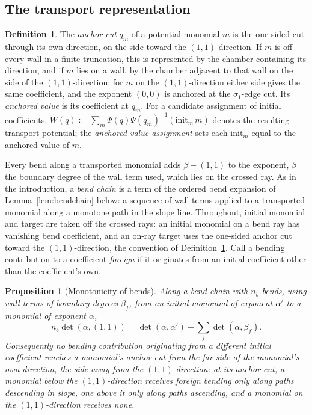 \documentclass[11pt]{amsart}
\newtheorem{proposition}[theorem]{Proposition}
\theoremstyle{definition}
\newtheorem{definition}[theorem]{Definition}
\theoremstyle{remark}
\begin{document}
\subsection{The transport representation}
\label{ssec:transport}

\begin{definition}
\label{def:anchor}
The \emph{anchor cut} $q_m$ of a potential monomial $m$ is the one-sided cut
through its own direction, on the side toward the $(1,1)$-direction. If $m$ is
off every wall in a finite truncation, this is represented by the chamber
containing its direction, and if $m$ lies on a wall, by the chamber adjacent
to that wall on the side of the $(1,1)$-direction; for $m$ on the
$(1,1)$-direction either side gives the
same coefficient, and the exponent $(0,0)$ is anchored at the $\sigma_1$-edge
cut. Its
\emph{anchored value} is its coefficient at $q_m$. For a
candidate assignment of initial coefficients,
$\widetilde W(q):=\sum_{m}\Psi(q)\Psi(q_m)^{-1}(\mathrm{init}_{m}\,m)$ denotes the
resulting transport potential; the \emph{anchored-value assignment} sets each
$\mathrm{init}_m$ equal to the anchored value of $m$.
\end{definition}

Every bend along a transported monomial adds $\beta-(1,1)$ to the exponent,
$\beta$ the boundary degree of the wall term used, which lies on the crossed
ray.  As in the introduction, a \emph{bend chain} is a term of the
ordered bend expansion of Lemma~\ref{lem:bendchain} below: a sequence of wall
terms applied to a transported monomial along a monotone path in the slope
line.  Throughout, initial
monomial and target are taken off the crossed rays: an initial monomial on a
bend ray has vanishing bend coefficient, and an on-ray target uses the one-sided anchor cut toward
the $(1,1)$-direction, the convention of Definition~\ref{def:anchor}. Call a
bending contribution to a coefficient \emph{foreign} if it originates from an
initial coefficient other than the coefficient's own.

\begin{proposition}[Monotonicity of bends]
\label{thm:nobackscatter}
Along a bend chain with $n_b$ bends, using wall terms of boundary degrees
$\beta_f$, from an initial monomial of exponent $\alpha'$ to a
monomial of exponent $\alpha$,
\[
n_b\det(\alpha,(1,1))
=\det(\alpha,\alpha')+\sum_{f}\det(\alpha,\beta_{f}).
\]
Consequently no bending contribution originating from a different initial
coefficient reaches a monomial's anchor cut from the far
side of the monomial's own direction, the side away from the
$(1,1)$-direction: at its anchor cut, a monomial below the $(1,1)$-direction
receives foreign bending only along paths descending in slope, one above it
only along paths ascending, and a monomial on the $(1,1)$-direction receives
none.
\end{proposition}
\end{document}
